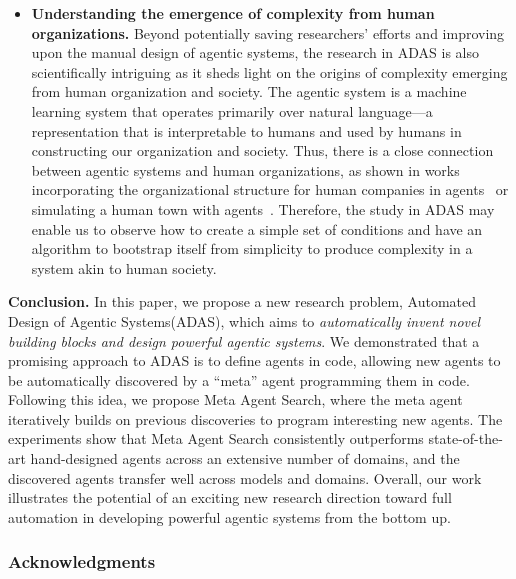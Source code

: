 \documentclass{article}
\newcommand{\problemlong}{Automated Design of Agentic Systems\xspace}
\newcommand{\problem}{ADAS\xspace}
\newcommand{\ouralgo}{Meta Agent Search\xspace}
\begin{document}
\begin{itemize}[label=\large\textbullet, left=0pt]
\item \noindent\textbf{Understanding the emergence of complexity from human organizations.}\hspace{0.3em} Beyond potentially saving researchers' efforts and improving upon the manual design of agentic systems, the research in \problem is also scientifically intriguing as it sheds light on the origins of complexity emerging from human organization and society. The agentic system is a machine learning system that operates primarily over natural language—a representation that is interpretable to humans and used by humans in constructing our organization and society. Thus, there is a close connection between agentic systems and human organizations, as shown in works incorporating the organizational structure for human companies in agents~\citep{hong2023metagpt} or simulating a human town with agents~\citep{park2023generative}. Therefore, the study in \problem may enable us to observe how to create a simple set of conditions and have an algorithm to bootstrap itself from simplicity to produce complexity in a system akin to human society.

\end{itemize}


\noindent\textbf{Conclusion.}\hspace{0.5em} In this paper, we propose a new research problem, \problemlong (\problem), which aims to \emph{automatically invent novel building blocks and design powerful agentic systems}. We demonstrated that a promising approach to \problem is to define agents in code, allowing new agents to be automatically discovered by a ``meta'' agent programming them in code. Following this idea, we propose \ouralgo, where the meta agent iteratively builds on previous discoveries to program interesting new agents. The experiments show that \ouralgo consistently outperforms state-of-the-art hand-designed agents across an extensive number of domains, and the discovered agents transfer well across models and domains. Overall, our work illustrates the potential of an exciting new research direction toward full automation in developing powerful agentic systems from the bottom up.






\subsubsection*{Acknowledgments}
\end{document}
